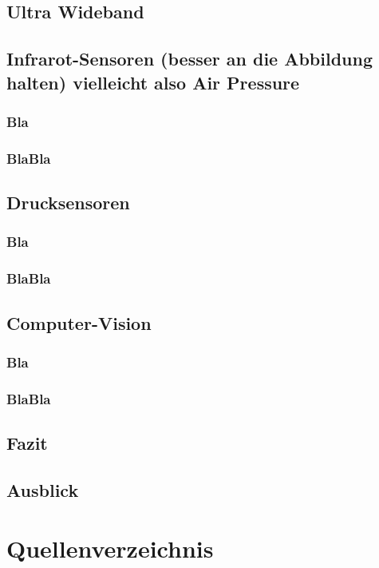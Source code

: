 \subsection{Ultra Wideband}

\subsection{Infrarot-Sensoren (besser an die Abbildung halten) vielleicht also Air Pressure}
\subsubsection{Bla}
\subsubsection{BlaBla}
\subsection{Drucksensoren}
\subsubsection{Bla}
\subsubsection{BlaBla}
\subsection{Computer-Vision}
\subsubsection{Bla}
\subsubsection{BlaBla}

\subsection{Fazit}

\subsection{Ausblick}

\newpage

\section{Quellenverzeichnis}
